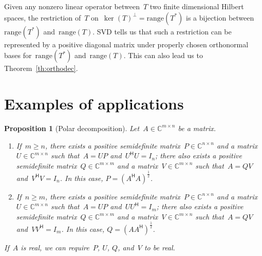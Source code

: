 \documentclass[11pt,a4paper]{article}  %
\numberwithin{equation}{section}
\newtheorem{proposition}{Proposition}%
\theoremstyle{definition}
\def\CC{\mathbb{C}}
\newcommand{\hmt}{{\scriptscriptstyle{{\mathsf{H}}}}}
\newcommand{\range}{\mathrm{range}}
\begin{document}
Given any nonzero linear operator between~$T$ two finite dimensional Hilbert spaces, the restriction
of~$T$ on~$\ker(T)^\perp = \range(T^*)$ is a bijection between~$\range(T^*)$ and~$\range(T)$.
SVD tells us that such a restriction can be represented by a positive diagonal matrix under properly
chosen orthonormal bases for~$\range(T^*)$ and~$\range(T)$. 
This can also lead us to Theorem~\ref{th:orthodec}.


\section{Examples of applications}

\begin{proposition}[Polar decomposition]
  \label{th:polar} Let~$A \in \CC^{m\times n}$ be a matrix.
  \begin{enumerate}[leftmargin=1.5em]
    \item If~$m\ge n$, there exists a positive semidefinite matrix~$P \in \CC^{n\times n}$ and
      a matrix~$U\in \CC^{m\times n}$ such that~$A = UP$ and~$U^\hmt U = I_n$; there also exists
      a positive semidefinite matrix~$Q\in \CC^{m\times m}$ and a matrix~$V\in\CC^{m\times n}$ such
      that~$A = QV$ and~$V^\hmt V = I_n$.
      In this case, $P = (A^\hmt A)^{\frac{1}{2}}$.
    \item If~$n\ge m$, there exists a positive semidefinite matrix~$P \in \CC^{n\times n}$ and
      a matrix~$U\in \CC^{m\times n}$ such that~$A = UP$ and~$UU^\hmt = I_m$; there also exists
      a positive semidefinite matrix~$Q\in \CC^{m\times m}$ and a matrix~$V\in\CC^{m\times n}$ such
      that~$A = QV$ and~$V V^\hmt = I_m$. In this case, $Q = (AA^\hmt)^{\frac{1}{2}}$.
  \end{enumerate}
   If~$A$ is real, we can require~$P$, $U$, $Q$, and~$V$ to be real.
\end{proposition}
\end{document}
